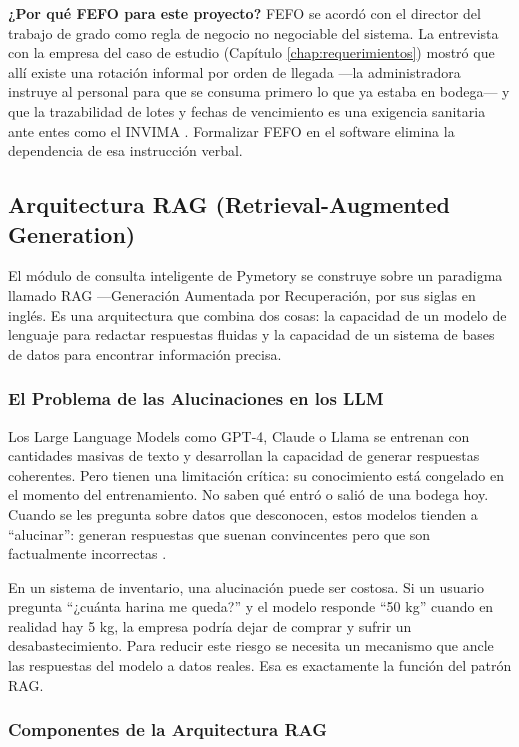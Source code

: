 \textbf{¿Por qué FEFO para este proyecto?} FEFO se acordó con el director del trabajo de grado como regla de negocio no negociable del sistema. La entrevista con la empresa del caso de estudio (Capítulo \ref{chap:requerimientos}) mostró que allí existe una rotación informal por orden de llegada ---la administradora instruye al personal para que se consuma primero lo que ya estaba en bodega--- y que la trazabilidad de lotes y fechas de vencimiento es una exigencia sanitaria ante entes como el INVIMA \cite{res2674_2013}. Formalizar FEFO en el software elimina la dependencia de esa instrucción verbal.

\subsection{Arquitectura RAG (Retrieval-Augmented Generation)}
\label{sec:rag_teoria}

El módulo de consulta inteligente de Pymetory se construye sobre un paradigma llamado RAG ---Generación Aumentada por Recuperación, por sus siglas en inglés. Es una arquitectura que combina dos cosas: la capacidad de un modelo de lenguaje para redactar respuestas fluidas y la capacidad de un sistema de bases de datos para encontrar información precisa.

\subsubsection{El Problema de las Alucinaciones en los LLM}

Los Large Language Models como GPT-4, Claude o Llama se entrenan con cantidades masivas de texto y desarrollan la capacidad de generar respuestas coherentes. Pero tienen una limitación crítica: su conocimiento está congelado en el momento del entrenamiento. No saben qué entró o salió de una bodega hoy. Cuando se les pregunta sobre datos que desconocen, estos modelos tienden a ``alucinar'': generan respuestas que suenan convincentes pero que son factualmente incorrectas \cite{zhao2023surveyllm}.

En un sistema de inventario, una alucinación puede ser costosa. Si un usuario pregunta ``¿cuánta harina me queda?'' y el modelo responde ``50 kg'' cuando en realidad hay 5 kg, la empresa podría dejar de comprar y sufrir un desabastecimiento. Para reducir este riesgo se necesita un mecanismo que ancle las respuestas del modelo a datos reales. Esa es exactamente la función del patrón RAG.

\subsubsection{Componentes de la Arquitectura RAG}

